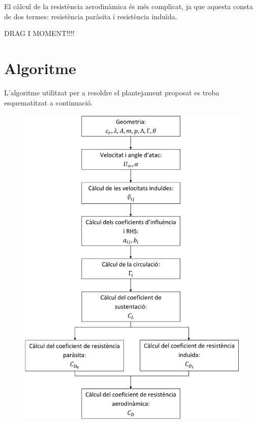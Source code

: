 El càlcul de la resistència aerodinàmica és més complicat, ja que aquesta consta de dos termes: resistència paràsita i resistència induïda.

DRAG I MOMENT!!!!

\section{Algoritme}
\label{algoritmeala}
L'algoritme utilitzat per a resoldre el plantejament proposat es troba esquematitzat a continuació.

\begin{figure}[H]
	\centering
	\includegraphics[scale=0.185]{./plots/algoritmewing}
\end{figure}